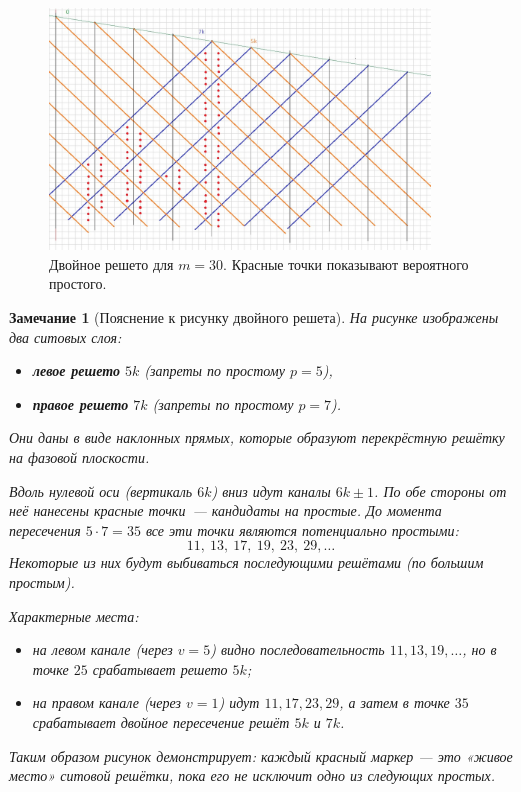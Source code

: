 \documentclass[11pt,a4paper]{article}
\newtheorem{remark}[definition]{Замечание}
\begin{document}
\begin{figure}[H]
\centering
\includegraphics[width=0.9\textwidth]{double_sieve.png} %
\caption{Двойное решето для $m=30$. Красные точки показывают вероятного простого.}
\label{fig:sieve}
\end{figure}
\begin{remark}[Пояснение к рисунку двойного решета]
На рисунке изображены два ситовых слоя: 
\begin{itemize}
  \item \textbf{левое решето} $5k$ (запреты по простому $p=5$),
  \item \textbf{правое решето} $7k$ (запреты по простому $p=7$).
\end{itemize}
Они даны в виде наклонных прямых, которые образуют перекрёстную решётку на фазовой плоскости.

Вдоль нулевой оси (вертикаль $6k$) вниз идут каналы $6k\pm1$. 
По обе стороны от неё нанесены красные точки~--- кандидаты на простые. 
До момента пересечения $5\cdot 7=35$ все эти точки являются потенциально простыми:
\[
11,\ 13,\ 17,\ 19,\ 23,\ 29, \dots
\]
Некоторые из них будут выбиваться последующими решётами (по большим простым).

Характерные места:
\begin{itemize}
  \item на левом канале (через $v=5$) видно последовательность $11,13,19,\dots$, но в точке $25$ срабатывает решето $5k$;
  \item на правом канале (через $v=1$) идут $11,17,23,29$, а затем в точке $35$ срабатывает \emph{двойное пересечение} решёт $5k$ и $7k$.
\end{itemize}

Таким образом рисунок демонстрирует: \emph{каждый красный маркер --- это «живое место» ситовой решётки, пока его не исключит одно из следующих простых.}
\end{remark}
\end{document}

